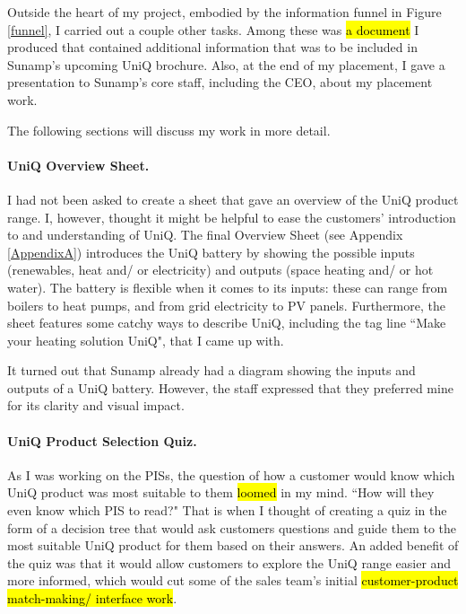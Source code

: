 Outside the heart of my project, embodied by the information funnel in Figure \ref{funnel}, I carried out a couple other tasks.
Among these was \hl{a document} I produced that contained additional information that was to be included in Sunamp's upcoming UniQ brochure.
Also, at the end of my placement, I gave a presentation to Sunamp's core staff, including the CEO, about my placement work.

The following sections will discuss my work in more detail.



\paragraph{UniQ Overview Sheet.}

I had not been asked to create a sheet that gave an overview of the UniQ product range.
I, however, thought it might be helpful to ease the customers' introduction to and understanding of UniQ.
The final Overview Sheet (see Appendix \ref{AppendixA}) introduces the UniQ battery by showing the possible inputs (renewables, heat and/ or electricity) and outputs (space heating and/ or hot water).
The battery is flexible when it comes to its inputs: these can range from boilers to heat pumps, and from grid electricity to PV panels.
Furthermore, the sheet features some catchy ways to describe UniQ, including the tag line ``Make your heating solution UniQ", that I came up with.

It turned out that Sunamp already had a diagram showing the inputs and outputs of a UniQ battery.
However, the staff expressed that they preferred mine for its clarity and visual impact.



\paragraph{UniQ Product Selection Quiz.} \label{sec:quiz}

As I was working on the PISs, the question of how a customer would know which UniQ product was most suitable to them \hl{loomed} in my mind.
``How will they even know which PIS to read?"
That is when I thought of creating a quiz in the form of a decision tree that would ask customers questions and guide them to the most suitable UniQ product for them based on their answers.
An added benefit of the quiz was that it would allow customers to explore the UniQ range easier and more informed, which would cut some of the sales team's initial \hl{customer-product match-making/ interface work}.

